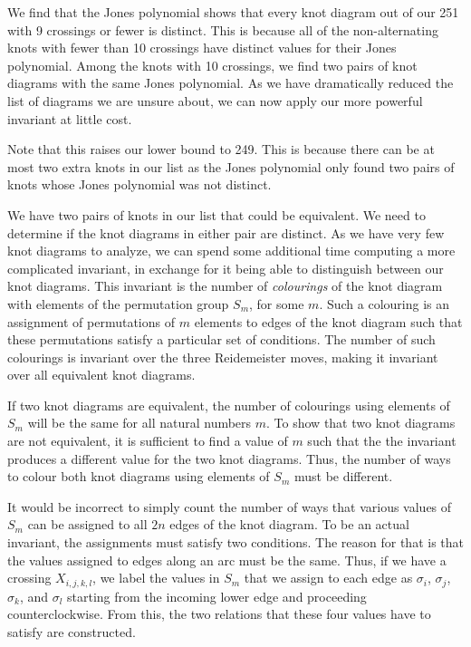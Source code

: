 \begin{paper}


We find that the Jones polynomial shows that every knot diagram out of our 251
with 9 crossings or fewer is distinct.
This is because all of the non-alternating knots with fewer than 10 crossings
have distinct values for their Jones polynomial.
Among the knots with 10 crossings, we find two pairs of knot diagrams with the
same Jones polynomial.
As we have dramatically reduced the list of diagrams we are unsure about, we can
now apply our more powerful invariant at little cost.

Note that this raises our lower bound to 249.
This is because there can be at most two extra knots in our list as the Jones
polynomial only found two pairs of knots whose Jones polynomial was not
distinct.


We have two pairs of knots in our list that could be equivalent.
We need to determine if the knot diagrams in either pair are distinct.
As we have very few knot diagrams to analyze, we can spend some additional time
computing a more complicated invariant, in exchange for it being able to
distinguish between our knot diagrams.
This invariant is the number of \textit{colourings} of the knot diagram with
elements of the permutation group $S_m$, for some $m$.
Such a colouring is an assignment of permutations of $m$ elements to edges of
the knot diagram such that these permutations satisfy a particular set of
conditions.
The number of such colourings is invariant over the three Reidemeister moves,
making it invariant over all equivalent knot diagrams.

If two knot diagrams are equivalent, the number of colourings using elements of
$S_m$ will be the same for all natural numbers $m$.
To show that two knot diagrams are not equivalent, it is sufficient to find a
value of $m$ such that the the invariant produces a different value for the two
knot diagrams.
Thus, the number of ways to colour both knot diagrams using elements of $S_m$
must be different.

It would be incorrect to simply count the number of ways that various values of
$S_m$ can be assigned to all $2n$ edges of the knot diagram.
To be an actual invariant, the assignments must satisfy two conditions.
The reason for that is that the values assigned to edges along an arc must be
the same.
Thus, if we have a crossing $X_{i,j,k,l}$, we label the values in $S_m$ that we
assign to each edge as $\sigma_i$, $\sigma_j$, $\sigma_k$, and $\sigma_l$
starting from the incoming lower edge and proceeding counterclockwise.
From this, the two relations that these four values have to satisfy are
constructed.


\end{paper}
